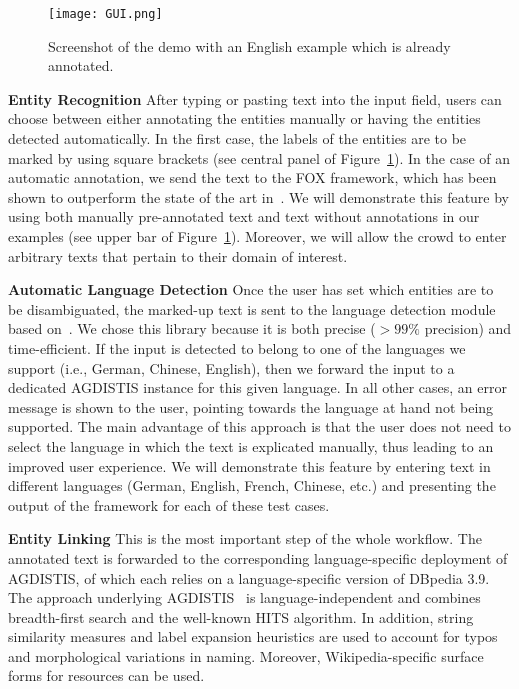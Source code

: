 \documentclass{llncs}
\begin{document}
\begin{figure}
\centering
\texttt{[image: GUI.png]}
\caption{Screenshot of the demo with an English example which is already annotated.}
\label{fig:gui}
\end{figure}

\noindent\textbf{Entity Recognition}
After typing or pasting text into the input field, users can choose between either annotating the entities manually or having the entities detected automatically.
In the first case, the labels of the entities are to be marked by using square brackets (see central panel of Figure~\ref{fig:gui}).
In the case of an automatic annotation, we send the text to the FOX framework, which has been shown to outperform the state of the art in~\cite{FOX}.
We will demonstrate this feature by using both manually pre-annotated text and text without annotations in our examples (see upper bar of Figure~\ref{fig:gui}).
Moreover, we will allow the crowd to enter arbitrary texts that pertain to their domain of interest.

\noindent\textbf{Automatic Language Detection}
Once the user has set which entities are to be disambiguated, the marked-up text is sent to the language detection module based on~\cite{nakatani2010langdetect}.
We chose this library because it is both precise ($>99\%$ precision) and time-efficient.
If the input is detected to belong to one of the languages we support (i.e., German, Chinese, English), then we forward the input to a dedicated AGDISTIS instance for this given language.
In all other cases, an error message is shown to the user, pointing towards the language at hand not being supported.
The main advantage of this approach is that the user does not need to select the language in which the text is explicated manually, thus leading to an improved user experience. 
We will demonstrate this feature by entering text in different languages (German, English, French, Chinese, etc.) and presenting the output of the framework for each of these test cases.

\noindent\textbf{Entity Linking} 
This is the most important step of the whole workflow.
The annotated text is forwarded to the corresponding language-specific deployment of AGDISTIS, of which each relies on a language-specific version of DBpedia 3.9. 
The approach underlying AGDISTIS~\cite{AGDISTIS_ISWC} is language-independent and combines breadth-first search and the well-known HITS algorithm. 
In addition, string similarity measures and label expansion heuristics are used to account for typos and morphological variations in naming.
Moreover, Wikipedia-specific surface forms for resources can be used. 
\end{document}
